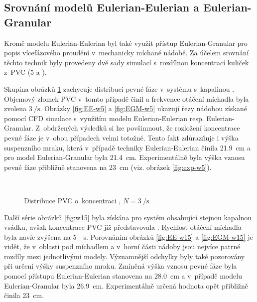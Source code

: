 \subsection{Srovnání modelů Eulerian-Eulerian a Eulerian-Granular}
Kromě modelu Eulerian-Eulerian byl také využit přístup Eulerian-Granular pro popis vícefázového proudění v~mechanicky míchané nádobě. Za účelem srovnání těchto technik byly provedeny dvě sady simulací s~rozdílnou koncentrací kuliček z~PVC (5 a ).

Skupina obrázků \ref{fig:w5} zachycuje distribuci pevné fáze v~systému s~kapalinou \pvpS{}. Objemový zlomek PVC v~tomto případě činil  a frekvence otáčení míchadla byla zvolena $\SI{3}{\per\second}$. Obrázky \ref{fig:EE-w5} a \ref{fig:EGM-w5} ukazují řezy nádobou získané pomocí CFD simulace s~využitím modelu Eulerian-Eulerian resp. Eulerian-Granular. Z~obdržených výsledků si lze povšimnout, že rozložení koncentrace pevné fáze je v~obou případech velmi totožné. Tento fakt zdůrazňuje i výška suspenzního mraku, která v~případě techniky Eulerian-Eulerian činila \SI{21.9}{\centi\meter} a pro model Eulerian-Granular byla \SI{21.4}{\centi\meter}. Experimentálně byla výška vznosu pevné fáze přibližně stanovena na \SI{23}{\centi\meter} (viz. obrázek \ref{fig:exp-w5}).

\begin{figure}[h!]
 \centering
  \qquad 
  \\
  \caption{Distribuce PVC o~koncentraci , $N=\SI{3}{\per\second}$}
  \label{fig:w5}
\end{figure}
Další série obrázků \ref{fig:w15} byla získána pro systém obsahující stejnou kapalnou vsádku, avšak koncentrace PVC již představovala . Rychlost otáčení míchadla byla navíc zvýšena na \SI{5}{\per\second}. Porovnáním obrázků \ref{fig:EE-w15} a \ref{fig:EGM-w15} je vidět, že v~oblasti pod míchadlem a v~horní části nádoby jsou nejvíce patrné rozdíly mezi jednotlivými modely. Významnější odchylky byly také pozorovány při určení výšky suspenzního mraku. Zmíněná výška vznosu pevné fáze byla pomocí přístupu Eulerian-Eulerian stanovena na \SI{28.0}{\centi\meter} a v~případě modelu Eulerian-Granular byla \SI{26.9}{\centi\meter}. Experimentálně určená hodnota opět přibližně činila \SI{23}{\centi\meter}. 

